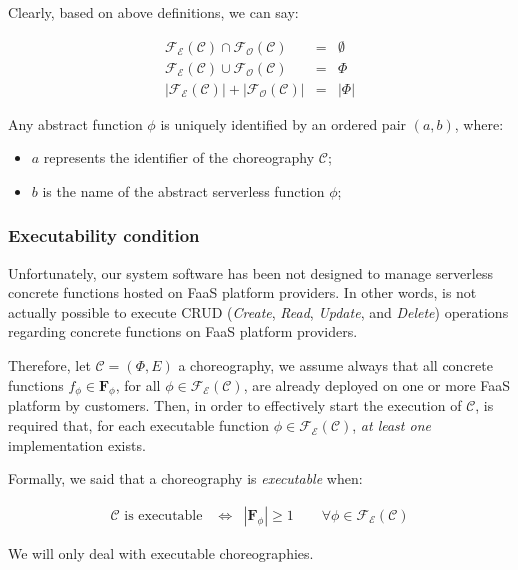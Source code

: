 \documentclass[12pt,a4paper]{report}
\begin{document}
Clearly, based on above definitions, we can say: 

\begin{eqnarray}
	\mathscr{F_E}(\mathcal{C}) \cap \mathscr{F_O}(\mathcal{C}) & = & \emptyset \\
	\mathscr{F_E}(\mathcal{C}) \cup \mathscr{F_O}(\mathcal{C}) & = & \Phi \\
	|\mathscr{F_E}(\mathcal{C})| + |\mathscr{F_O}(\mathcal{C})| &=& |\Phi| 
\end{eqnarray}

Any abstract function $\phi$ is uniquely identified by an ordered pair $(a, b)$, where:
\begin{itemize}
	\item $a$ represents the identifier of the choreography $\mathcal{C}$;
	\item $b$ is the name of the abstract serverless function $\phi$;
\end{itemize}

\subsubsection{Executability condition}

Unfortunately, our system software has been not designed to manage serverless concrete functions hosted on FaaS platform providers. In other words, is not actually possible to execute CRUD (\textit{Create}, \textit{Read}, \textit{Update}, and \textit{Delete}) operations regarding concrete functions on FaaS platform providers.

Therefore, let $\mathcal{C} = (\Phi,E)$ a choreography, we assume always that all concrete functions $f_{\phi} \in \textbf{F}_{\phi}$, for all $\phi \in \mathscr{F_E}(\mathcal{C})$, are already deployed on one or more FaaS platform by customers. Then, in order to effectively start the execution of $\mathcal{C}$, is required that, for each executable function $\phi \in \mathscr{F_E}(\mathcal{C})$, \textit{at least one} implementation exists.

Formally, we said that a choreography is \textit{executable} when: 

\begin{eqnarray}
	\label{eqn:SchedulabilityConditionOne}
	\mathcal{C} \text{ is executable } & \Leftrightarrow & |\textbf{F}_{\phi}| \geq 1 \qquad \forall \phi \in \mathscr{F_E}(\mathcal{C})
\end{eqnarray}

We will only deal with executable choreographies.
\end{document}
